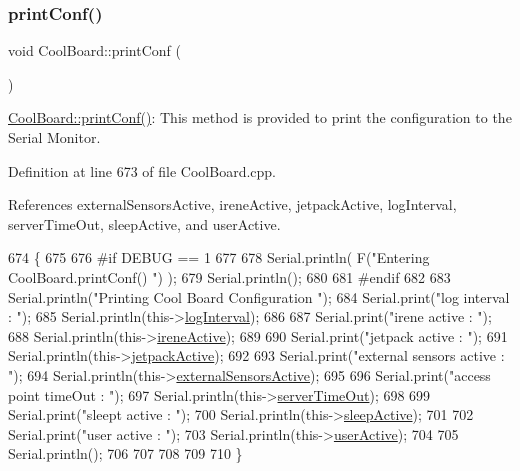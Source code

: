 \subsubsection{\texorpdfstring{print\+Conf()}{printConf()}}
{\footnotesize\ttfamily void Cool\+Board\+::print\+Conf (\begin{DoxyParamCaption}{ }\end{DoxyParamCaption})}

\hyperlink{classCoolBoard_a486507b8f0981d3cc671ed31c2145755}{Cool\+Board\+::print\+Conf()}\+: This method is provided to print the configuration to the Serial Monitor. 

Definition at line 673 of file Cool\+Board.\+cpp.



References external\+Sensors\+Active, irene\+Active, jetpack\+Active, log\+Interval, server\+Time\+Out, sleep\+Active, and user\+Active.


\begin{DoxyCode}
674 \{
675 
676 \textcolor{preprocessor}{#if DEBUG == 1}
677     
678     Serial.println( F(\textcolor{stringliteral}{"Entering CoolBoard.printConf() "}) );
679     Serial.println();
680 
681 \textcolor{preprocessor}{#endif}
682 
683     Serial.println(\textcolor{stringliteral}{"Printing Cool Board Configuration "});
684     Serial.print(\textcolor{stringliteral}{"log interval      : "});
685     Serial.println(this->\hyperlink{classCoolBoard_a84bc94413b64973e4aba8c467c97006c}{logInterval});
686 
687     Serial.print(\textcolor{stringliteral}{"irene active      : "});
688     Serial.println(this->\hyperlink{classCoolBoard_a9c3f7ac625481ee2ae802a25d97a4ae0}{ireneActive});
689 
690     Serial.print(\textcolor{stringliteral}{"jetpack active        : "});
691     Serial.println(this->\hyperlink{classCoolBoard_a9be03a913d26e558328935ca3b59a75e}{jetpackActive});
692 
693     Serial.print(\textcolor{stringliteral}{"external sensors active   : "});
694     Serial.println(this->\hyperlink{classCoolBoard_a638b00b76aeb819ecfd4c10b8cdd7bb7}{externalSensorsActive});
695 
696     Serial.print(\textcolor{stringliteral}{"access point timeOut  : "});
697     Serial.println(this->\hyperlink{classCoolBoard_a7a8d8d3d316220cdd049cd63c1aa8fe6}{serverTimeOut});
698 
699     Serial.print(\textcolor{stringliteral}{"sleept active         : "});
700     Serial.println(this->\hyperlink{classCoolBoard_a0a51b2287139f66c738101fb53139230}{sleepActive});
701 
702     Serial.print(\textcolor{stringliteral}{"user active       : "});
703     Serial.println(this->\hyperlink{classCoolBoard_a6395459131d6889a3005f79c7a35e964}{userActive});
704 
705     Serial.println();
706 
707 
708 
709 
710 \}
\end{DoxyCode}
\mbox{\label{classCoolBoard_ad03abdce2e65f520bbf2cff0f2d083cf}} 
